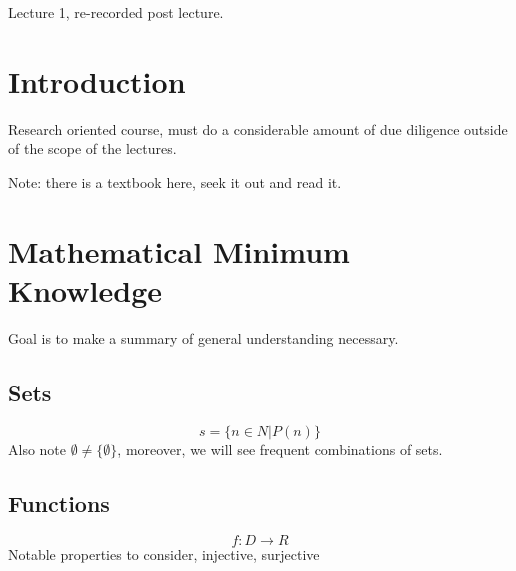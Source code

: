 \documentclass{article}
\begin{document}
Lecture 1, re-recorded post lecture.

\section*{Introduction}

Research oriented course, must do a considerable amount of due diligence outside of the scope of the lectures.

Note: there is a textbook here, seek it out and read it.

\section*{Mathematical Minimum Knowledge}

Goal is to make a summary of general understanding necessary.

\subsection{Sets}

\begin{equation}
				s = \{n \in N | P(n)\}
\end{equation}
Also note $\emptyset \neq \{\emptyset\}$, moreover, we will see frequent combinations of sets.

\subsection{Functions}

\begin{equation}
				f: D \rightarrow R
\end{equation}
Notable properties to consider, injective, surjective
\end{document}
